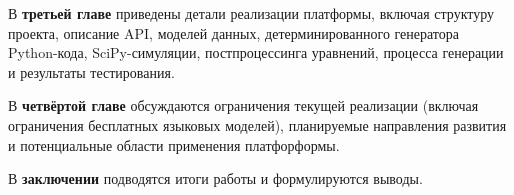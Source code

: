 В \textbf{третьей главе} приведены детали реализации платформы, включая структуру проекта, описание API, моделей данных, детерминированного генератора Python-кода, SciPy-симуляции, постпроцессинга уравнений, процесса генерации и результаты тестирования.

В \textbf{четвёртой главе} обсуждаются ограничения текущей реализации (включая ограничения бесплатных языковых моделей), планируемые направления развития и потенциальные области применения платфорформы.

В \textbf{заключении} подводятся итоги работы и формулируются выводы.
